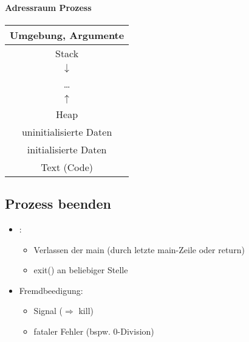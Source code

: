 \paragraph{Adressraum Prozess} \parskp
\begin{tabular}{| c |}
\hline 
Umgebung, Argumente\\
\hline 
Stack\\
$\downarrow$\\
…\\
$\uparrow$\\
Heap\\
\hline
uninitialisierte Daten\\
\hline
initialisierte Daten\\
\hline
Text (Code)\\
\hline
\end{tabular}
\subsection{Prozess beenden}
\begin{itemize}
\item {}:
\begin{itemize}
\item Verlassen der main (durch letzte main-Zeile oder return)
\item exit() an beliebiger Stelle
\end{itemize}
\item Fremdbeedigung:
\begin{itemize}
\item Signal ($\Rightarrow$ kill)
\item fataler Fehler (bspw. 0-Division)
\end{itemize}
\end{itemize}

